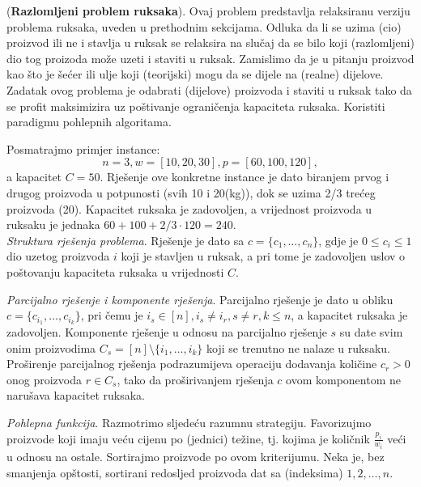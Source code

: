 \begin{example} (\textbf{Razlomljeni problem ruksaka}). 
  Ovaj problem pre\-dstavlja relaksiranu verziju problema ruksaka, uveden u prethodnim sekcijama. Odluka da li se uzima (cio)  proizvod ili ne i stavlja u ruksak se relaksira na slučaj da se bilo koji (razlomljeni) dio tog proizoda može uzeti i staviti u ruksak. Zamislimo da je u pitanju proizvod kao što je šećer ili ulje koji (teorijski) mogu da se dijele na (realne) dijelove.  \\
  
   Zadatak ovog problema je odabrati  (dijelove) proizvoda i staviti u ruksak tako da se profit maksimizira uz poštivanje ograničenja  kapaciteta ruksaka. Koristiti paradigmu pohlepnih algoritama. 
\end{example}

\begin{solution}
	Posmatrajmo primjer instance: $$n = 3, w = [10, 20, 30], p = [60, 100, 120],$$  a 
	kapacitet $C = 50$.  Rješenje ove konkretne instance je dato biranjem prvog i drugog proizvoda u potpunosti (svih 10 i
	20(kg)), dok se uzima 2/3 trećeg proizvoda (20). Kapacitet ruksaka je zadovoljen,
	a vrijednost proizvoda u ruksaku je jednaka $60 + 100 + 2/3 \cdot  120
	= 240$. \\
	
    \textit{Struktura rješenja problema}.  Rješenje je dato sa $c = \{c_1,\ldots, c_n\}$, gdje je $0 \leq c_i \leq 1$ dio uzetog
    proizvoda $i$ koji je stavljen u ruksak, a pri tome je zadovoljen  uslov o poštovanju kapaciteta ruksaka u vrijednosti   $C$.
    
    \textit{Parcijalno rješenje i komponente rješenja}. Parcijalno rješenje je dato u obliku $c = \{ c_{i_1}, \ldots, c_{i_k}  \}$, pri čemu je $i_s \in [n],  i_s \neq i_r, s\neq r,   k \leq n$, a kapacitet ruksaka je zadovoljen. 
    Komponente rješenje u odnosu na parcijalno rješenje $s$ su date svim onim proizvodima $C_s = [n] \setminus \{  {i_1}, \ldots, {i_k} \}$ koji se trenutno ne nalaze   u ruksaku. Proširenje parcijalnog rješenja podrazu\-mijeva operaciju dodavanja  količine $c_r>0$ onog proizvoda $r \in C_s$, tako da proširivanjem rješenja $c$ ovom komponentom ne narušava kapacitet ruksaka. 
    
    \textit{Pohlepna funkcija}.  Razmotrimo sljedeću razumnu strategiju. Favori\-zujmo proizvode koji imaju veću cijenu po (jednici) težine, tj. kojima je količnik  $\frac{p_i}{w_i}$ veći u odnosu na ostale. Sortirajmo proizvode po ovom kriterijumu. Neka je, bez smanjenja opštosti, sortirani redosljed proizvo\-da   dat sa (indeksima) $1,2, \ldots, n$.   \\
    

\end{solution}
